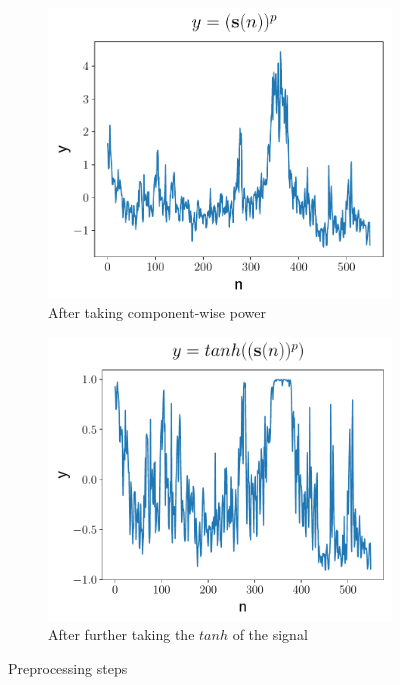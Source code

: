  \begin{figure}[h]
      \begin{subfigure}[h]{0.5\textwidth}
          \includegraphics[width=\textwidth]{./description/images/squeezed}
          \caption{ After taking component-wise power}
          \label{fig:squeezed}
      \end{subfigure}
      \begin{subfigure}[h]{0.5\textwidth}
          \includegraphics[width=\textwidth]{./description/images/tanh}
          \caption{After further taking the $tanh$ of the signal}
          \label{fig:tanh}
      \end{subfigure}
     
      \caption{Preprocessing steps}\label{fig:animals}
  \end{figure}
  
